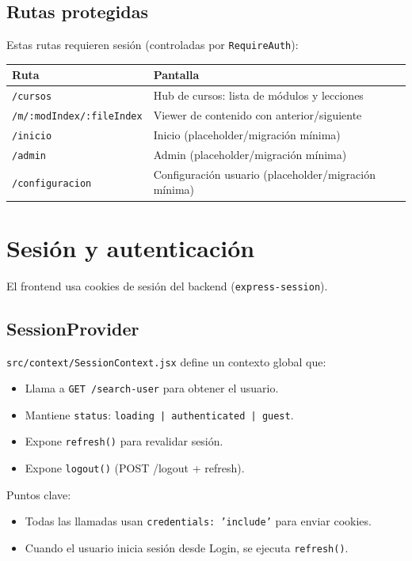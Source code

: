 \documentclass[12pt,a4paper]{article}
\begin{document}
\subsection{Rutas protegidas}
Estas rutas requieren sesi\'on (controladas por \texttt{RequireAuth}):
\begin{longtable}{|>{\raggedright\arraybackslash}p{3.5cm}|>{\raggedright\arraybackslash}p{10cm}|}
\hline
\textbf{Ruta} & \textbf{Pantalla} \\
\hline
\texttt{/cursos} & Hub de cursos: lista de m\'odulos y lecciones \\
\hline
\texttt{/m/:modIndex/:fileIndex} & Viewer de contenido con anterior/siguiente \\
\hline
\texttt{/inicio} & Inicio (placeholder/migraci\'on m\'inima) \\
\hline
\texttt{/admin} & Admin (placeholder/migraci\'on m\'inima) \\
\hline
\texttt{/configuracion} & Configuraci\'on usuario (placeholder/migraci\'on m\'inima) \\
\hline
\end{longtable}

\section{Sesi\'on y autenticaci\'on}
El frontend usa cookies de sesi\'on del backend (\texttt{express-session}).

\subsection{SessionProvider}
\texttt{src/context/SessionContext.jsx} define un contexto global que:
\begin{itemize}[leftmargin=*]
  \item Llama a \texttt{GET /search-user} para obtener el usuario.
  \item Mantiene \texttt{status}: \texttt{loading | authenticated | guest}.
  \item Expone \texttt{refresh()} para revalidar sesi\'on.
  \item Expone \texttt{logout()} (POST /logout + refresh).
\end{itemize}

Puntos clave:
\begin{itemize}[leftmargin=*]
  \item Todas las llamadas usan \texttt{credentials: 'include'} para enviar cookies.
  \item Cuando el usuario inicia sesi\'on desde Login, se ejecuta \texttt{refresh()}.
\end{itemize}
\end{document}

